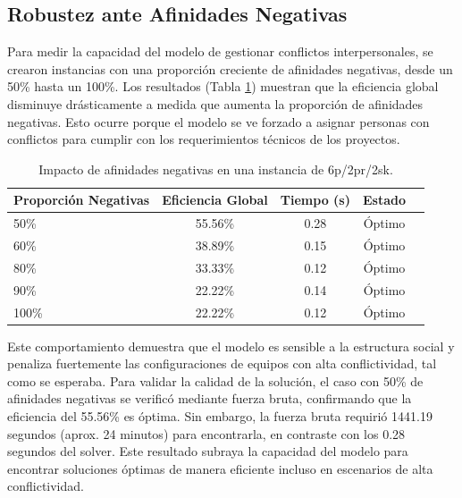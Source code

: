 \documentclass[conference]{IEEEtran}
\begin{document}
\subsection{Robustez ante Afinidades Negativas}
Para medir la capacidad del modelo de gestionar conflictos interpersonales, se crearon instancias con una proporción creciente de afinidades negativas, desde un 50\% hasta un 100\%. Los resultados (Tabla \ref{tab:robustez}) muestran que la eficiencia global disminuye drásticamente a medida que aumenta la proporción de afinidades negativas. Esto ocurre porque el modelo se ve forzado a asignar personas con conflictos para cumplir con los requerimientos técnicos de los proyectos.

\begin{table}[htbp]
    \centering
    \caption{Impacto de afinidades negativas en una instancia de 6p/2pr/2sk.}
    \label{tab:robustez}
    \begin{tabularx}{\linewidth}{@{}lcccc@{}}
        \toprule
        \textbf{Proporción Negativas} & \textbf{Eficiencia Global} & \textbf{Tiempo (s)} & \textbf{Estado} \\
        \midrule
        50\%                          & 55.56\%                    & 0.28                & Óptimo          \\
        60\%                          & 38.89\%                    & 0.15                & Óptimo          \\
        80\%                          & 33.33\%                    & 0.12                & Óptimo          \\
        90\%                          & 22.22\%                    & 0.14                & Óptimo          \\
        100\%                         & 22.22\%                    & 0.12                & Óptimo          \\
        \bottomrule
    \end{tabularx}
\end{table}

Este comportamiento demuestra que el modelo es sensible a la estructura social y penaliza fuertemente las configuraciones de equipos con alta conflictividad, tal como se esperaba. Para validar la calidad de la solución, el caso con 50\% de afinidades negativas se verificó mediante fuerza bruta, confirmando que la eficiencia del 55.56\% es óptima. Sin embargo, la fuerza bruta requirió 1441.19 segundos (aprox. 24 minutos) para encontrarla, en contraste con los 0.28 segundos del solver. Este resultado subraya la capacidad del modelo para encontrar soluciones óptimas de manera eficiente incluso en escenarios de alta conflictividad.
\end{document}
